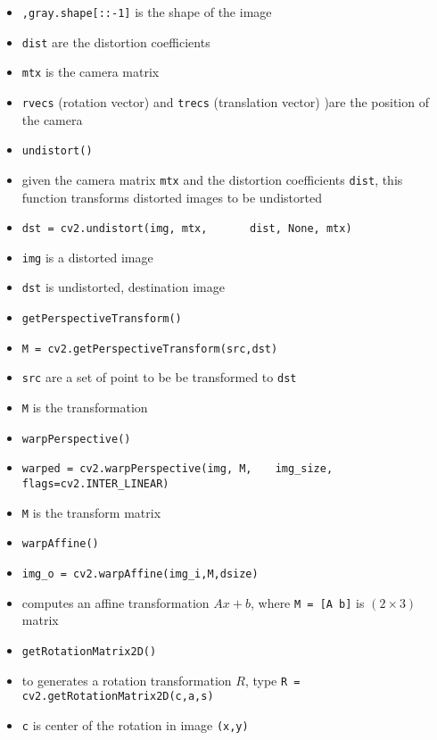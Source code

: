 \documentclass[onecolumn]{IEEEtran} %
\begin{document}
\begin{itemize}
        \ei
        \item \verb|,gray.shape[::-1]| is the shape of the image
        \item \verb|dist| are the distortion coefficients
        \item \verb|mtx| is the camera matrix
        \item \verb|rvecs| (rotation vector) and \verb|trecs| (translation vector) )are the position of the camera
    \ei
    \item \verb|undistort()|
    \bi
        \item given the camera matrix \verb|mtx| and the distortion coefficients \verb|dist|, this function transforms distorted images to be undistorted
        \item \verb|dst = cv2.undistort(img, mtx,| \newline
        \verb|      dist, None, mtx)|
        \bi
            \item \verb|img| is a distorted image
            \item \verb|dst| is undistorted, destination image
        \ei
    \ei
    \item \verb|getPerspectiveTransform()|
    \bi
        \item \verb|M = cv2.getPerspectiveTransform(src,dst)|
        \item \verb|src| are a set of point to be be transformed to \verb|dst|
        \item \verb|M| is the transformation
    \ei
    \item \verb|warpPerspective()|
    \bi
        \item \verb|warped = cv2.warpPerspective(img, M,| \newline \verb|   img_size, flags=cv2.INTER_LINEAR)|
        \item \verb|M| is the transform matrix
    \ei
    \item \verb|warpAffine()|
    \bi
        \item \verb|img_o = cv2.warpAffine(img_i,M,dsize)|
        \item computes an affine transformation $Ax +b$, where \verb|M = [A b]| is $(2 \times 3)$ matrix
    \ei
    \item \verb|getRotationMatrix2D()|
    \bi
        \item to generates a rotation transformation $R$, type \newline
        \verb|R = cv2.getRotationMatrix2D(c,a,s)|
        \item \verb|c| is center of the rotation in image \verb|(x,y)|

\end{itemize}
\end{document}
